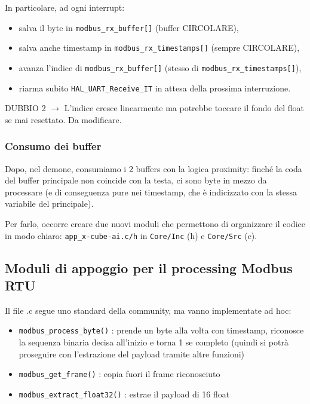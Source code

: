 In particolare, ad ogni interrupt: 

\begin{itemize}
    \item salva il byte in \texttt{modbus\_rx\_buffer[]} (buffer CIRCOLARE),
    \item salva anche timestamp in \texttt{modbus\_rx\_timestamps[]} (sempre CIRCOLARE),
    \item avanza l’indice di \texttt{modbus\_rx\_buffer[]} (stesso di \texttt{modbus\_rx\_timestamps[]}),
    \item riarma subito \texttt{HAL\_UART\_Receive\_IT} in attesa della prossima interruzione.
\end{itemize}

DUBBIO 2 $\rightarrow$ L'indice cresce linearmente ma potrebbe toccare il fondo del float se mai resettato. Da modificare.

\subsubsection{Consumo dei buffer}
Dopo, nel demone, consumiamo i 2 buffers con la logica proximity: finché la coda del buffer principale non coincide con la testa, ci sono byte in mezzo da processare (e di conseguenza pure nei timestamp, che è indicizzato con la stessa variabile del principale).

Per farlo, occorre creare due nuovi moduli che permettono di organizzare il codice in modo chiaro: \texttt{app\_x-cube-ai.c/h} in \texttt{Core/Inc} (h) e \texttt{Core/Src} (c).

\subsection{Moduli di appoggio per il processing Modbus RTU}

Il file .c segue uno standard della community, ma vanno implementate ad hoc:

\begin{itemize}
    \item \texttt{modbus\_process\_byte()} : prende un byte alla volta con timestamp, riconosce la sequenza binaria decisa all'inizio e torna 1 se completo (quindi si potrà proseguire con l'estrazione del payload tramite altre funzioni)
    \item \texttt{modbus\_get\_frame()} : copia fuori il frame riconosciuto 
    \item \texttt{modbus\_extract\_float32()} : estrae il payload di 16 float
\end{itemize}

